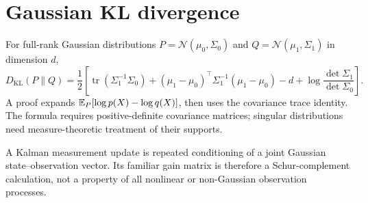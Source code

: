 \section{Gaussian KL divergence}
For full-rank Gaussian distributions
$P=\mathcal N(\mu_0,\Sigma_0)$ and
$Q=\mathcal N(\mu_1,\Sigma_1)$ in dimension $d$,
\[
D_{\mathrm{KL}}(P\|Q)=\frac12\left[
\operatorname{tr}(\Sigma_1^{-1}\Sigma_0)
+(\mu_1-\mu_0)^\top\Sigma_1^{-1}(\mu_1-\mu_0)
-d+\log\frac{\det\Sigma_1}{\det\Sigma_0}\right].
\]
A proof expands $\mathbb{E}_P[\log p(X)-\log q(X)]$, then
uses the covariance trace identity. The formula requires
positive-definite covariance matrices; singular distributions
need measure-theoretic treatment of their supports.

\begin{example}
A Kalman measurement update is repeated conditioning of a joint
Gaussian state--observation vector. Its familiar gain matrix is
therefore a Schur-complement calculation, not a property of
all nonlinear or non-Gaussian observation processes.
\end{example}